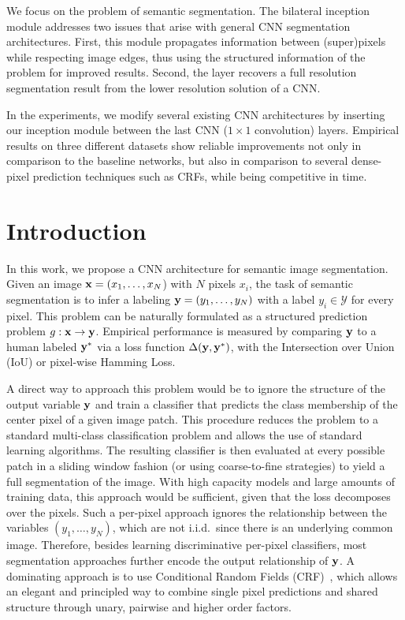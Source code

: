 We focus on the problem of semantic segmentation.
The bilateral inception module addresses two issues that
arise with general CNN segmentation architectures. First, this module propagates
information between (super)pixels while respecting image edges, thus
using the structured information of the problem for improved results.
Second, the layer recovers a full resolution segmentation result from the
lower resolution solution of a CNN.

In the experiments, we modify several existing CNN architectures by inserting
our inception module between the last CNN ($1\times1$ convolution) layers. Empirical results
on three different datasets show reliable improvements not only in comparison
to the baseline networks, but also in comparison to several dense-pixel prediction
techniques such as CRFs, while being competitive in time.

\section{Introduction}

In this work, we propose a CNN architecture for semantic image segmentation.
Given an image $\mathbf{x}=(x_1,\ldots,x_N$) with $N$ pixels $x_i$, the task of semantic segmentation is to infer a labeling $\mathbf{y}=(y_1,\ldots,y_N)$ with a label $y_i\in\mathcal{Y}$ for every pixel.
This problem can be naturally formulated as a structured prediction problem $g:\mathbf{x}\rightarrow \mathbf{y}$.
Empirical performance is measured by comparing $\mathbf{y}$ to a human labeled $\mathbf{y}^*$ via a
loss function $\Delta(\mathbf{y},\mathbf{y}^*)$, \eg with the Intersection over Union (IoU) or pixel-wise
Hamming Loss.

A direct way to approach this problem would be to ignore the structure of the
output variable $\mathbf{y}$ and train a classifier that predicts the class membership of the center
pixel of a given image patch. This procedure reduces the problem to a standard multi-class
classification problem and allows the use of standard learning algorithms. The resulting
classifier is then evaluated at every possible patch in a sliding window fashion (or using
coarse-to-fine strategies) to yield a full segmentation of the image.
With high capacity models and large amounts of training data, this approach would
be sufficient, given that the loss decomposes over the pixels.
Such a per-pixel approach ignores the relationship between the variables $(y_1,\ldots,y_N)$, which are not i.i.d.~since there is an underlying common image. Therefore, besides learning
discriminative per-pixel classifiers, most segmentation approaches further encode the output
relationship of $\mathbf{y}$. A dominating approach is to use Conditional Random Fields
(CRF)~\cite{lafferty2001crf}, which allows an elegant and principled way
to combine single pixel predictions and shared structure through unary, pairwise and
higher order factors.

